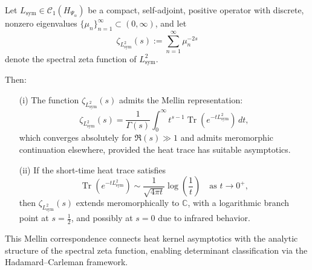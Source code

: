 \begin{lemma}
\label{lem:spectral_zeta_from_heat}
Let \( L_{\mathrm{sym}} \in \mathcal{C}_1(H_{\Psi_\alpha}) \) be a compact, self-adjoint, positive operator with discrete, nonzero eigenvalues \( \{ \mu_n \}_{n=1}^\infty \subset (0, \infty) \), and let
\[
\zeta_{L_{\mathrm{sym}}^2}(s) := \sum_{n=1}^\infty \mu_n^{-2s}
\]
denote the spectral zeta function of \( L_{\mathrm{sym}}^2 \).

Then:
\begin{enumerate}
    \item[\textnormal{(i)}] The function \( \zeta_{L_{\mathrm{sym}}^2}(s) \) admits the Mellin representation:
    \[
    \zeta_{L_{\mathrm{sym}}^2}(s)
    = \frac{1}{\Gamma(s)} \int_0^\infty t^{s-1} \operatorname{Tr}(e^{-t L_{\mathrm{sym}}^2}) \, dt,
    \]
    which converges absolutely for \( \Re(s) \gg 1 \) and admits meromorphic continuation elsewhere, provided the heat trace has suitable asymptotics.

    \item[\textnormal{(ii)}] If the short-time heat trace satisfies
    \[
    \operatorname{Tr}(e^{-t L_{\mathrm{sym}}^2}) \sim \frac{1}{\sqrt{4\pi t}} \log\left(\frac{1}{t}\right)
    \quad \text{as } t \to 0^+,
    \]
    then \( \zeta_{L_{\mathrm{sym}}^2}(s) \) extends meromorphically to \( \mathbb{C} \), with a logarithmic branch point at \( s = \tfrac{1}{2} \), and possibly at \( s = 0 \) due to infrared behavior.
\end{enumerate}

\medskip
\noindent
This Mellin correspondence connects heat kernel asymptotics with the analytic structure of the spectral zeta function, enabling determinant classification via the Hadamard–Carleman framework.
\end{lemma}
% 